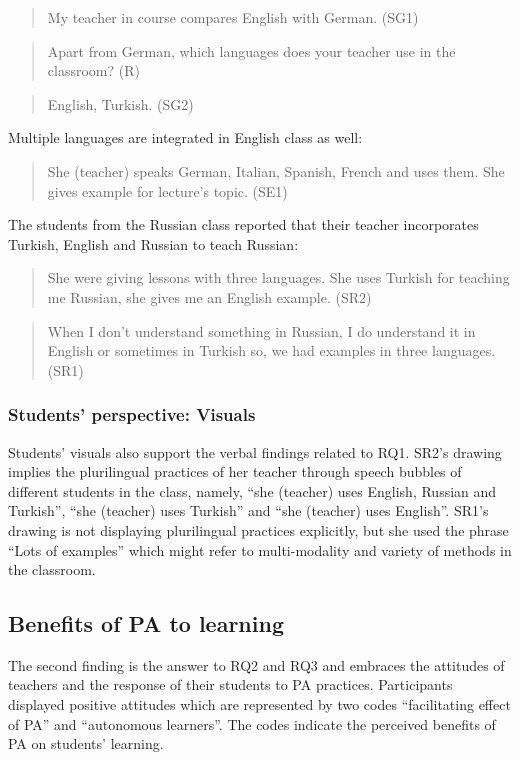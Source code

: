 \documentclass[output=paper]{../langscibook}
\begin{document}
\begin{quote}
My teacher in course compares English with German. (SG1)
\end{quote}

\begin{quote}
Apart from German, which languages does your teacher use in the classroom? (R) 
\end{quote}

\begin{quote}
English, Turkish. (SG2)
\end{quote}

\noindent Multiple languages are integrated in English class as well:

\begin{quote}
She (teacher) speaks German, Italian, Spanish, French and uses them. She gives example for lecture’s topic. (SE1)
\end{quote}

\noindent The students from the Russian class reported that their teacher incorporates Turkish, English and Russian to teach Russian:

\begin{quote}
She were giving lessons with three languages. She uses Turkish for teaching me Russian, she gives me an English example. (SR2)
\end{quote}

\begin{quote}
When I don’t understand something in Russian, I do understand it in English or sometimes in Turkish so, we had examples in three languages. (SR1) 
\end{quote}


\subsubsection{Students’ perspective: Visuals}
Students’ visuals also support the verbal findings related to RQ1. SR2’s drawing implies the plurilingual practices of her teacher through speech bubbles of different students in the class, namely, “she (teacher) uses English, Russian and Turkish”, “she (teacher) uses Turkish” and “she (teacher) uses English”. SR1’s drawing is not displaying plurilingual practices explicitly, but she used the phrase “Lots of examples” which might refer to multi-modality and variety of methods in the classroom.



\subsection{Benefits of PA to learning}
The second finding is the answer to RQ2 and RQ3 and embraces the attitudes of teachers and the response of their students to PA practices. Participants displayed positive attitudes which are represented by two codes “facilitating effect of PA” and “autonomous learners”.  The codes indicate the perceived benefits of PA on students’ learning.
\end{document}
